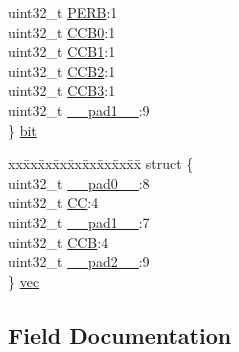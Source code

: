 \begin{DoxyCompactItemize}
\begin{tabbing}
\>uint32\_t \mbox{\hyperlink{union_t_c_c___s_y_n_c_b_u_s_y___type_a097c0f751731b2d8c768978685a6c55f}{PERB}}:1\\
\>uint32\_t \mbox{\hyperlink{union_t_c_c___s_y_n_c_b_u_s_y___type_a3fbcee44f6a6d8ab9500b1bcf2b8a594}{CCB0}}:1\\
\>uint32\_t \mbox{\hyperlink{union_t_c_c___s_y_n_c_b_u_s_y___type_a59033ff787d390382020e64a6ea555c9}{CCB1}}:1\\
\>uint32\_t \mbox{\hyperlink{union_t_c_c___s_y_n_c_b_u_s_y___type_a1b66b93561d13f29e1c393da2815da3a}{CCB2}}:1\\
\>uint32\_t \mbox{\hyperlink{union_t_c_c___s_y_n_c_b_u_s_y___type_aa547224424c34d4672db4c406990856f}{CCB3}}:1\\
\>uint32\_t \mbox{\hyperlink{union_t_c_c___s_y_n_c_b_u_s_y___type_a6712ba6dd1d5b43d2d56ff8ac4e275a7}{\_\_pad1\_\_}}:9\\
\} \mbox{\hyperlink{union_t_c_c___s_y_n_c_b_u_s_y___type_a24086790496b7e0a7aeed7dcaa8a4627}{bit}}\\

\end{tabbing}\item 
\begin{tabbing}
xx\=xx\=xx\=xx\=xx\=xx\=xx\=xx\=xx\=\kill
struct \{\\
\>uint32\_t \mbox{\hyperlink{union_t_c_c___s_y_n_c_b_u_s_y___type_a3e57c2ef1c3ffb36722f000cc1156824}{\_\_pad0\_\_}}:8\\
\>uint32\_t \mbox{\hyperlink{union_t_c_c___s_y_n_c_b_u_s_y___type_a10f2b0518af5a37e14c710d230272d1d}{CC}}:4\\
\>uint32\_t \mbox{\hyperlink{union_t_c_c___s_y_n_c_b_u_s_y___type_a6712ba6dd1d5b43d2d56ff8ac4e275a7}{\_\_pad1\_\_}}:7\\
\>uint32\_t \mbox{\hyperlink{union_t_c_c___s_y_n_c_b_u_s_y___type_a01afc958e04cff1d06806b323d21d694}{CCB}}:4\\
\>uint32\_t \mbox{\hyperlink{union_t_c_c___s_y_n_c_b_u_s_y___type_a9ce12a63de64ef64ae2d59d128251cae}{\_\_pad2\_\_}}:9\\
\} \mbox{\hyperlink{union_t_c_c___s_y_n_c_b_u_s_y___type_a8f2ea05c46fff06ee3e14144f51d1933}{vec}}\\

\end{tabbing}\end{DoxyCompactItemize}


\subsection{Field Documentation}
\mbox{\label{union_t_c_c___s_y_n_c_b_u_s_y___type_a3e57c2ef1c3ffb36722f000cc1156824}} 
